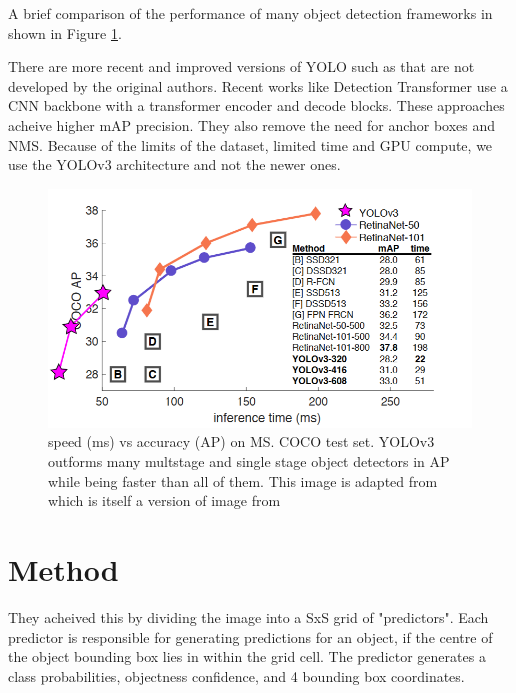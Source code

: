 \documentclass[10pt,twocolumn,letterpaper]{article}
\begin{document}
A brief comparison of the performance of many object detection frameworks in shown in Figure \ref {fig:detector_comparison}.

There are more recent and improved versions of YOLO such as \cite{yolov7} that are not developed by the original authors. Recent works like Detection Transformer \cite{DETR} use a CNN backbone with a transformer encoder and decode blocks. These approaches acheive higher mAP precision. They also remove the need for anchor boxes and NMS. Because of the limits of the dataset, limited time and GPU compute, we use the YOLOv3 architecture and not the newer ones.

\begin{figure}[t]
	\begin{center}
		\includegraphics[width=1.0\linewidth]{object_detector_comparisons.png}
	\end{center}
	\caption{speed (ms) vs accuracy (AP) on MS. COCO test set. YOLOv3 outforms many multstage and single stage object detectors in AP while being faster than all of them. This image is adapted from \cite{redmon2018yolov3} which is itself a version of image from \cite{retinaNet}}
	\label{fig:detector_comparison}
\end{figure}

 

\section{Method}
They acheived this by dividing the image into a SxS grid of "predictors". Each predictor is responsible for generating predictions for an object, if the centre of the object bounding box lies in within the grid cell. The predictor generates a class probabilities, objectness confidence,
and 4 bounding box coordinates.
\end{document}
